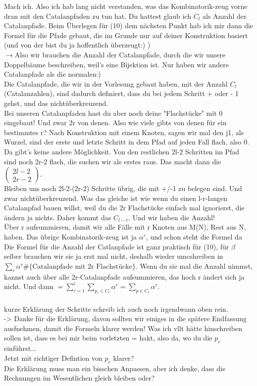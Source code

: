 \documentclass[a4paper, 11pt]{scrreprt}
\begin{document}
Mach ich. Also ich hab lang nicht verstanden, was das Kombinatorik-zeug vorne dran mit den Catalanpfaden zu tun hat. Du hattest glaub ich $C_l$ als Anzahl der Catalanpfade. Beim Überlegen für (10) dem nächsten Punkt hab ich mir dann die Formel für die Pfade gebaut, die im Grunde nur auf deiner Konstruktion basiert (und von der bist du ja hoffentlich überzeugt:) )\\
$ \longrightarrow $Also wir brauchen die Anzahl der Catalanpfade, durch die wir unsere Doppelbäume beschreiben, weil's eine Bijektion ist. Nur haben wir andere Catalanpfade als die normalen:)\\
Die Catalanpfade, die wir in der Vorlesung gebaut haben, mit der Anzahl $C_l$ (Catalanzahlen), sind dadurch definiert, dass du bei jedem Schritt + oder - 1 gehst, und das nichtüberkreuzend. \\ Bei unseren Catalanpfaden hast du aber noch deine "Flachstücke" mit 0 eingebaut! Und zwar 2r von denen. Also wie viele gibts von denen für ein bestimmtes r? Nach Konstruktion mit einem Knoten, sagen wir mal den j1, als Wurzel, sind der erste und letzte Schritt in dem Pfad auf jeden Fall flach, also 0. Da gibt's keine andere Möglichkeit. Von den restlichen 2l-2 Schritten im Pfad sind noch 2r-2 flach, die suchen wir als erstes raus. Das macht dann die $\begin{pmatrix} 2l-2\\2r-2\end{pmatrix} $.\\ 
Bleiben uns noch 2l-2-(2r-2) Schritte übrig, die mit +/-1 zu belegen sind. Und zwar nichtüberkreuzend. Was das gleiche ist wie wenn du einen l-r-langen Catalanpfad bauen willst, weil du die 2r Flachstücke einfach mal ignorierst, die ändern ja nichts. Daher kommt das $ C_{l-r} $. Und wir haben die Anzahl!\\ Über r aufsummieren, damit wir alle Fälle mit r Knoten aus M(N), Rest aus N, haben. Das übrige Kombinatorik-zeug ist ja $\alpha^r  $, und schon steht die Formel da\\
Die Formel für die Anzahl der Catlanpfade ist ganz praktisch für (10), für $ \beta$ selber brauchen wir sie ja erst mal nicht, deshalb wieder umcshreiben in $ \sum_{r} \alpha^{r} \#\{ \text{Catalanpfade mit 2r Flachstücke} \}$. Wenn du sie mal die Anzahl nimmst, kannst auch über alle 2r-Catalanpfade aufsummieren, das hoch r ändert sich ja nicht. Und dann $= \sum_{r=1}^{l} \sum_{p_{r} \in C_{l}} \alpha^{r} = \sum_{p\in C_l} \alpha^r $.\\ \\
kurze Erklärung der Schritte schreib ich auch noch irgendwann oben rein.\\
 -> Danke für die Erklärung, davon sollten wir einiges in die spätere Endfassung ausfnehmen, damit die Formeln klarer werden! Was ich vllt hätte hinschreiben sollen ist, dass es bei mir beim vorletzten = hakt, also da, wo du die \(p_r\) einführst... \\ Jetzt mit richtiger Defintion von $ p_r $ klarer? \\
Die Erklärung muss man ein bisschen Anpassen, aber ich denke, dass die Rechnungen im Wesentlichen gleich bleiben oder?
\end{document}
